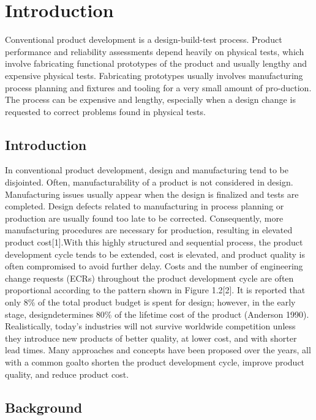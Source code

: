 \chapter{Introduction}

Conventional product development is a design-build-test process.
Product performance and reliability assessments depend heavily on physical tests,
which involve fabricating functional prototypes of the product and usually lengthy and expensive physical tests. Fabricating prototypes usually involves manufacturing process planning and fixtures and tooling for a very small amount of pro-duction. The process can be expensive and lengthy, especially when a design change is requested to correct problems found in physical tests.

\section{Introduction}

In conventional product development, design and manufacturing tend to be disjointed. Often, manufacturability of a product is not considered in design. Manufacturing issues usually appear when the design is finalized and tests are completed. Design defects related to manufacturing in process planning or production are usually found too late to be corrected. Consequently, more manufacturing procedures are necessary for production, resulting in elevated product cost[1].With this highly structured and sequential process, the product development cycle tends to be extended, cost is elevated, and product quality is often compromised to avoid further delay. Costs and the number of engineering change requests (ECRs) throughout the product development cycle are often proportional according to the pattern shown in Figure 1.2[2]. It is reported that only 8\% of the total product budget is spent for design; however, in the early stage, designdetermines 80\% of the lifetime cost of the product (Anderson 1990). Realistically, today’s industries will not survive worldwide competition unless they introduce new products of better quality, at lower cost, and with shorter lead times. Many approaches and concepts have been proposed over the years, all with a common goalto shorten the product development cycle, improve product quality, and reduce product cost.

\section{Background}

